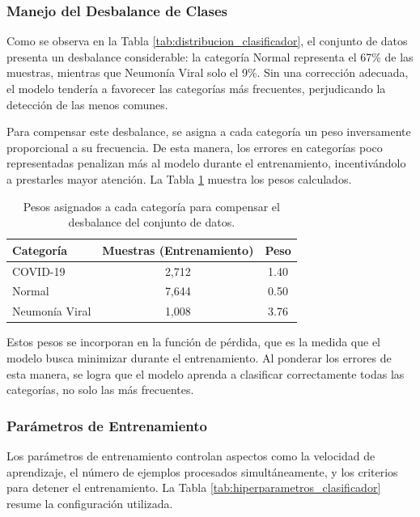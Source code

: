 \subsubsection{Manejo del Desbalance de Clases}

Como se observa en la Tabla \ref{tab:distribucion_clasificador}, el conjunto de datos presenta un desbalance considerable: la categoría Normal representa el 67\% de las muestras, mientras que Neumonía Viral solo el 9\%. Sin una corrección adecuada, el modelo tendería a favorecer las categorías más frecuentes, perjudicando la detección de las menos comunes.

Para compensar este desbalance, se asigna a cada categoría un peso inversamente proporcional a su frecuencia. De esta manera, los errores en categorías poco representadas penalizan más al modelo durante el entrenamiento, incentivándolo a prestarles mayor atención. La Tabla \ref{tab:class_weights} muestra los pesos calculados.

\begin{table}[htbp]
    \centering
    \caption{Pesos asignados a cada categoría para compensar el desbalance del conjunto de datos.}
    \label{tab:class_weights}
    \small
    \begin{tabular}{@{}lcc@{}}
        \toprule
        \textbf{Categoría} & \textbf{Muestras (Entrenamiento)} & \textbf{Peso} \\
        \midrule
        COVID-19 & 2,712 & 1.40 \\
        Normal & 7,644 & 0.50 \\
        Neumonía Viral & 1,008 & 3.76 \\
        \bottomrule
    \end{tabular}
\end{table}

Estos pesos se incorporan en la función de pérdida, que es la medida que el modelo busca minimizar durante el entrenamiento. Al ponderar los errores de esta manera, se logra que el modelo aprenda a clasificar correctamente todas las categorías, no solo las más frecuentes.

\subsubsection{Parámetros de Entrenamiento}

Los parámetros de entrenamiento controlan aspectos como la velocidad de aprendizaje, el número de ejemplos procesados simultáneamente, y los criterios para detener el entrenamiento. La Tabla \ref{tab:hiperparametros_clasificador} resume la configuración utilizada.

